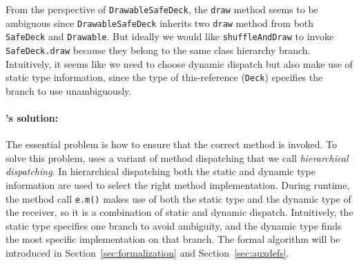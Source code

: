 From the perspective of \lstinline|DrawableSafeDeck|, the \lstinline|draw| method seems to be ambiguous since \lstinline|DrawableSafeDeck| inherits two \lstinline|draw| method from both \lstinline|SafeDeck| and \lstinline|Drawable|. But ideally we would
like \lstinline|shuffleAndDraw| to invoke \lstinline|SafeDeck.draw|
because they belong to the same class hierarchy branch. Intuitively, it 
seems like we need to choose dynamic dispatch but also make use of static type
information, since the type of this-reference (\lstinline|Deck|)
specifies the branch to use unambiguously.


\paragraph{\MIM's solution:} 
The essential problem is how to ensure that the correct method is
invoked. To solve this problem, \MIM{} uses a variant of method
dispatching that we call \textit{hierarchical dispatching}. In
hierarchical dispatching both the static and dynamic type information 
are used to select the right method implementation.
During runtime, the method call \lstinline|e.m()|
makes use of both the static type and the dynamic type of the
receiver, so it is a
combination of static and dynamic dispatch. Intuitively, the static type specifies one branch
to avoid ambiguity, and the dynamic type finds the most specific implementation on that branch. The formal algorithm will be introduced in Section~\ref{sec:formalization} and Section~\ref{sec:auxdefs}.

